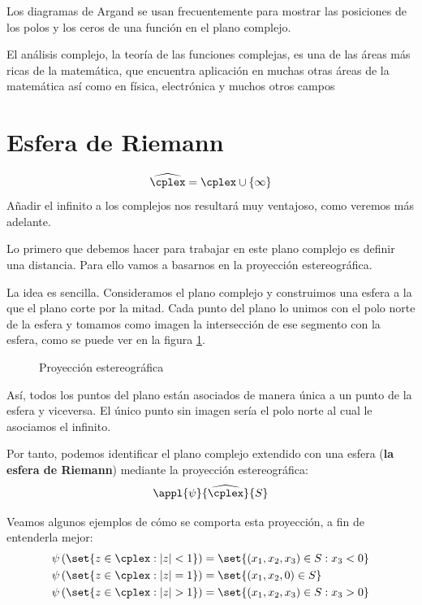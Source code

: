 \documentclass{apuntes}
\begin{document}
Los diagramas de Argand se usan frecuentemente para mostrar las posiciones de los polos y los ceros de una función en el plano complejo.

El análisis complejo, la teoría de las funciones complejas, es una de las áreas más ricas de la matemática, que encuentra aplicación en muchas otras áreas de la matemática así como en física, electrónica y muchos otros campos

\section{Esfera de Riemann}
\begin{defn}
\[\widehat{\cplex}=\cplex \cup \{\infty\}\]
Añadir el infinito a los complejos nos resultará muy ventajoso, como veremos más adelante.
\end{defn}

Lo primero que debemos hacer para trabajar en este plano complejo es definir una distancia. Para ello vamos a basarnos en la proyección estereográfica.

La idea es sencilla. Consideramos el plano complejo y construimos una esfera a la que el plano corte por la mitad. Cada punto del plano lo unimos con el polo norte de la esfera y tomamos como imagen la intersección de ese segmento con la esfera, como se puede ver en la figura \ref{figProyeccionEstereografica}.

\begin{figure}[hbtp]
\centering

\caption{Proyección estereográfica}
\label{figProyeccionEstereografica}
\end{figure}

Así, todos los puntos del plano están asociados de manera única a un punto de la esfera y viceversa. El único punto sin imagen sería el polo norte al cual le asociamos el infinito.

Por tanto, podemos identificar el plano complejo extendido con una esfera (\textbf{la esfera de Riemann}) mediante la proyección estereográfica:
\[\appl{\psi}{\widehat{\cplex}}{S}\]

\begin{example}
Veamos algunos ejemplos de cómo se comporta esta proyección, a fin de entenderla mejor:
\begin{align*}
\psi\left(\set{z \in \cplex : |z|<1}\right) &= \set{(x_1,x_2,x_3) \in S: x_3<0} \\
\psi\left(\set{z \in \cplex : |z|=1}\right) &= \set{(x_1,x_2,0)\in S} \\
\psi\left(\set{z \in \cplex : |z|>1}\right) &= \set{(x_1,x_2,x_3) \in S: x_3>0}
\end{align*}
\end{example}
\end{document}
